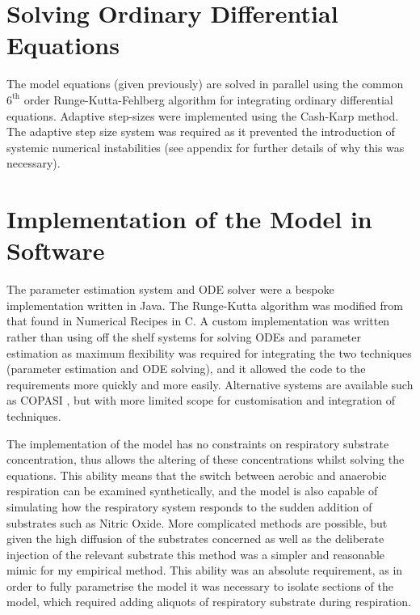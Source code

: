 \section{Solving Ordinary Differential Equations}
The model equations (given previously) are solved in parallel using the common $\mathrm{6}^\mathrm{th}$ order Runge-Kutta-Fehlberg algorithm for integrating ordinary differential equations\cite{Butcher2003}. Adaptive step-sizes were implemented using the Cash-Karp method\cite{Cash1990}. The adaptive step size system was required as it prevented the introduction of systemic numerical instabilities (see appendix for further details of why this was necessary).


\section{Implementation of the Model in Software}
The parameter estimation system and ODE solver were a bespoke implementation written in Java. The Runge-Kutta algorithm was modified from that found in Numerical Recipes in C\cite{Press1992}. A custom implementation was written rather than using off the shelf systems for solving ODEs and parameter estimation as maximum flexibility was required for integrating the two techniques (parameter estimation and ODE solving), and it allowed the code to the requirements more quickly and more easily. Alternative systems are available such as COPASI \cite{Hoops2006}, but with more limited scope for customisation and integration of techniques.

The implementation of the model has no constraints on respiratory substrate concentration, thus allows the altering of these concentrations whilst solving the equations. %
This ability means that the switch between aerobic and anaerobic respiration can be examined synthetically, and the model is also capable of simulating how the respiratory system responds to the sudden addition of substrates such as Nitric Oxide. More complicated methods are possible, but given the high diffusion of the substrates concerned as well as the deliberate injection of the relevant substrate this method was a simpler and reasonable mimic for my empirical method. This ability was an absolute requirement, as in order to fully parametrise the model it was necessary to isolate sections of the model, which required adding aliquots of respiratory substrate during respiration.

